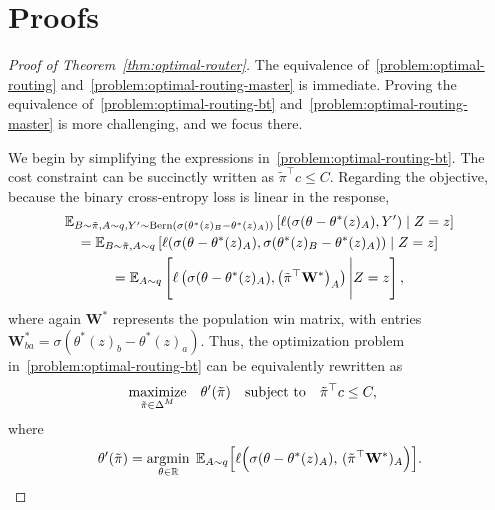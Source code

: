 \section{Proofs}
\label{app:proofs}

\begin{proof}[Proof of Theorem~\ref{thm:optimal-router}]
    The equivalence of~\eqref{problem:optimal-routing} and~\eqref{problem:optimal-routing-master} is immediate.
    Proving the equivalence of~\eqref{problem:optimal-routing-bt} and~\eqref{problem:optimal-routing-master} is more challenging, and we focus there.
    
    We begin by simplifying the expressions in~\eqref{problem:optimal-routing-bt}.
    The cost constraint can be succinctly written as $\tilde\pi^\top c \leq C$.
    Regarding the objective, because the binary cross-entropy loss is linear in the response,
    \begin{multline}
        \mathbb{E}_{B \sim \tilde\pi, A \sim q, Y' \sim \mathrm{Bern}(\sigma(\theta^*(z)_B - \theta^*(z)_A))}\left[ \ell(\sigma(\theta - \theta^*(z)_A), Y') \mid Z = z\right] \\
        = \mathbb{E}_{B \sim \tilde\pi, A \sim q}\left[ \ell(\sigma(\theta - \theta^*(z)_A), \sigma(\theta^*(z)_B - \theta^*(z)_A)) \mid Z = z\right] \\
        = \mathbb{E}_{A \sim q}\left[ \ell\left(\sigma(\theta - \theta^*(z)_A), \left(\tilde\pi^\top \mathbf{W}^*\right)_A\right) \Bigg\vert Z = z\right],
    \end{multline}
    where again $\mathbf{W^*}$ represents the population win matrix, with entries $\mathbf{W}^*_{ba} = \sigma(\theta^*(z)_b - \theta^*(z)_a)$.
    Thus, the optimization problem in~\eqref{problem:optimal-routing-bt} can be equivalently rewritten as
    \begin{equation}
    \label{eq:optimal-routing-nested}
    \begin{aligned}
        \operatorname*{maximize}_{\substack{ \tilde\pi \in \Delta^M }} \quad 
            & \theta'(\tilde\pi) 
            \quad \text{subject to}\quad
            \tilde\pi^\top c \le C,
    \end{aligned}
    \end{equation}
    where 
    \begin{equation}
    \theta'(\tilde\pi) 
    = 
    \operatorname*{argmin}_{\theta \in \mathbb{R}}
    \;
    \mathbb{E}_{A \sim q}\Bigl[
      \ell\Bigl(\sigma(\theta - \theta^*(z)_A),\,
        (\tilde\pi^\top \mathbf{W}^*)_A
      \Bigr)
    \Bigr].
    \end{equation}

\end{proof}
